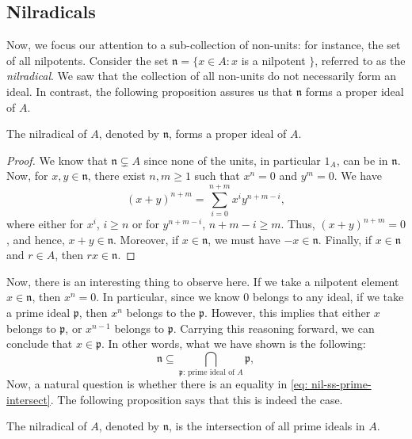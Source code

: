 \subsection{Nilradicals}
Now, we focus our attention to a sub-collection of non-units: for instance, the set of all nilpotents. Consider the set $\mathfrak{n}=\{x \in A: x$ is a nilpotent $\}$, referred to as the {\it nilradical}. We saw that the collection of all non-units do not necessarily form an ideal. In contrast, the following proposition assures us that $\mathfrak{n}$ forms a proper ideal of $A$.
\begin{proposition}\label{prop: nilpotent-proper}
    The nilradical of $A$, denoted by $\mathfrak{n}$, forms a proper ideal of $A$.
\end{proposition} 
\begin{proof}
    We know that $\mathfrak{n} \subsetneq A$ since none of the units, in particular $1_A$, can be in $\mathfrak{n}$. Now, for $x, y \in \mathfrak{n}$, there exist $n,m \ge 1$ such that $x^{n}=0$ and $y^{m}=0$. We have
    \[(x+y)^{n+m} = \sum_{i=0}^{n+m}x^{i}y^{n+m-i},\]
    where either for $x^i$, $i \ge n$ or for $y^{n+m-i}$, $n+m-i \ge  m$. Thus, $(x+y)^{n+m} = 0$, and hence, $x+y \in \mathfrak{n}$.
    Moreover, if $x \in \mathfrak{n}$, we must have $-x \in \mathfrak{n}$.
    Finally, if $x \in \mathfrak{n}$ and $r \in A$, then $r x \in \mathfrak{n}$.
\end{proof}
Now, there is an interesting thing to observe here. If we take a nilpotent element $x \in \mathfrak{n}$, then $x^{n}=0$. In particular, since we know $0$ belongs to any ideal, if we take a prime ideal $\mathfrak{p}$, then $x^{n}$ belongs to the $\mathfrak{p}$. However, this implies that either $x$ belongs to $\mathfrak{p}$, or $x^{n-1}$ belongs to $\mathfrak{p}$. Carrying this reasoning forward, we can conclude that $x \in \mathfrak{p}$. In other words, what we have shown is the following:
\begin{equation}\label{eq: nil-ss-prime-intersect}
    \mathfrak{n} \subseteq \bigcap_{\mathfrak{p} \text{: prime ideal of } A} \mathfrak{p},
\end{equation}
Now, a natural question is whether there is an equality in \eqref{eq: nil-ss-prime-intersect}. The following proposition says that this is indeed the case.
\begin{proposition}\label{prop: nilradical-prime}
    The nilradical of $A$, denoted by $\mathfrak{n}$, is the intersection of all prime ideals in $A$.
\end{proposition}

